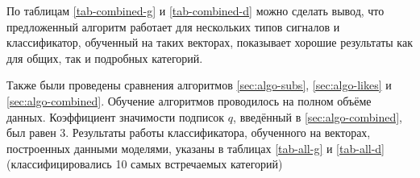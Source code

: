 \documentclass[times,specification,annotation]{itmo-student-thesis}
\begin{document}
%


По таблицам \ref{tab-combined-g} и \ref{tab-combined-d} можно сделать вывод, что предложенный алгоритм работает для нескольких типов сигналов и классификатор, обученный на таких векторах, показывает хорошие результаты как для общих, так и подробных категорий.

Также были проведены сравнения алгоритмов \ref{sec:algo-subs},  \ref{sec:algo-likes} и  \ref{sec:algo-combined}. Обучение алгоритмов проводилось на полном объёме данных. Коэффициент значимости подписок $q$, введённый в \ref{sec:algo-combined}, был равен 3. Результаты работы классификатора, обученного на векторах, построенных данными моделями, указаны в таблицах \ref{tab-all-g} и  \ref{tab-all-d} (классифицировались 10 самых встречаемых категорий)
\end{document}
